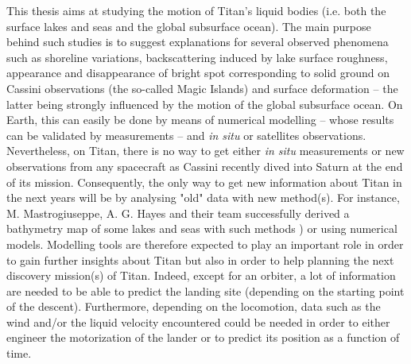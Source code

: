 This thesis aims at studying the motion of Titan's liquid bodies (i.e. both the surface lakes and seas and the global subsurface ocean). The main purpose behind such studies is to suggest explanations for several observed phenomena such as shoreline variations, backscattering induced by lake surface roughness, appearance and disappearance of bright spot corresponding to solid ground on Cassini observations (the so-called Magic Islands) and surface deformation -- the latter being strongly influenced by the motion of the global subsurface ocean. On Earth, this can easily be done by means of numerical modelling -- whose results can be validated by measurements -- and \textit{in situ} or satellites observations. Nevertheless, on Titan, there is no way to get either \textit{in situ} measurements or new observations from any spacecraft as Cassini recently dived into Saturn at the end of its mission. Consequently, the only way to get new information about Titan in the next years will be by analysing "old" data with new method(s). For instance, M. Mastrogiuseppe, A. G. Hayes and their team successfully derived a bathymetry map of some lakes and seas with such methods \citep{hayes2016lakes,hayes2016bathymetry, mastrogiuseppe2014bathymetry,mastrogiuseppe2016radar,mastrogiuseppe2018bathymetry}) or using numerical models. Modelling tools are therefore expected to play an important role in order to gain further insights about Titan but also in order to help planning the next discovery mission(s) of Titan. Indeed, except for an orbiter, a lot of information are needed to be able to predict the landing site (depending on the starting point of the descent). Furthermore, depending on the locomotion, data such as the wind and/or the liquid velocity encountered could be needed in order to either engineer the motorization of the lander or to predict its position as a function of time.






%
